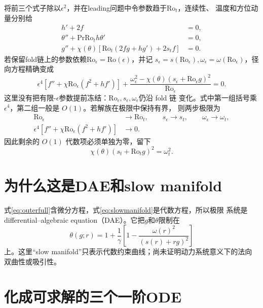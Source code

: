 \documentclass[UTF8,zihao=-4,openany]{ctexbook}
\newcommand{\eps}{\epsilon}
\newcommand{\Ro}{\mathrm{Ro}}
\newcommand{\Pran}{\mathrm{Pr}}
\begin{document}
将前三个式子除以$\eps^2$，并在leading问题中令参数趋于$\Ro_t$，连续性、
温度和方位动量分别给
\begin{subequations}\label{eq:outerfull}
\begin{align}
 h'+2f&=0,\\
 \theta''+\Pran\Ro_t h\theta'&=0,\\
 g''+\chi(\theta)\left[\Ro_t(2fg+hg')+2s_tf\right]&=0.
\end{align}
\end{subequations}
若保留fold链上的参数依赖$\Ro_\eps=\Ro(\eps)$，并记
$s_\eps=s(\Ro_\eps),\omega_\eps=\omega(\Ro_\eps)$，径向方程精确变成
\begin{equation}\label{eq:outerradialeps}
 \eps^4\left[f''+\chi\Ro_\eps(f^2+hf')\right]
 +\frac{\omega_\eps^2-\chi(\theta)(s_\eps+\Ro_\eps g)^2}{\Ro_\eps}=0.
\end{equation}
这里没有把有限-$\eps$参数提前冻结：$\Ro_\eps,s_\eps,\omega_\eps$仍沿 fold 链
变化。式中第一组括号乘 $\eps^4$，第二组一般是 $O(1)$。若解族在极限中保持有界，
则两步极限为
\begin{align*}
 \Ro_\eps&\longrightarrow\Ro_t,\qquad
 s_\eps\longrightarrow s_t,\qquad \omega_\eps\longrightarrow\omega_t,\\
 \eps^4\left[f''+\chi\Ro_\eps(f^2+hf')\right]&\longrightarrow0.
\end{align*}
因此剩余的 $O(1)$ 代数项必须单独为零，留下
\begin{equation}\label{eq:slowmanifold}
 \boxed{\chi(\theta)(s_t+\Ro_tg)^2=\omega_t^2.}
\end{equation}

\section{为什么这是DAE和slow manifold}

式\eqref{eq:outerfull}含微分方程，式\eqref{eq:slowmanifold}是代数方程，所以极限
系统是differential--algebraic equation（DAE）。它把$g$和$\theta$限制在
\begin{equation}\label{eq:thetaofg}
 \theta(g;r)=1+\frac1\gamma\left[1-\frac{\omega(r)^2}{(s(r)+rg)^2}\right]
\end{equation}
上。这里“slow manifold”只表示代数约束曲线；尚未证明动力系统意义下的法向
双曲性或吸引性。

\section{化成可求解的三个一阶ODE}
\end{document}

